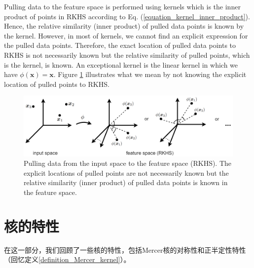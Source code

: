 \documentclass[lang=cn,10pt]{gorgeousnbook}
\numberwithin{equation}{section}%
\numberwithin{figure}{section}%
\begin{document}
Pulling data to the feature space is performed using kernels which is the inner product of points in RKHS according to Eq. (\ref{equation_kernel_inner_product}). Hence, the relative similarity (inner product) of pulled data points is known by the kernel. However, in most of kernels, we cannot find an explicit expression for the pulled data points. 
Therefore, the exact location of pulled data points to RKHS is not necessarily known but the relative similarity of pulled points, which is the kernel, is known. 
An exceptional kernel is the linear kernel in which we have $\phi(\boldsymbol{x}) = \boldsymbol{x}$. 
Figure \ref{figure_pulling} illustrates what we mean by not knowing the explicit location of pulled points to RKHS. 


\begin{figure}[!t]
\centering
\includegraphics[width=6in]{./images/pulling}
\caption{Pulling data from the input space to the feature space (RKHS). The explicit locations of pulled points are not necessarily known but the relative similarity (inner product) of pulled data points is known in the feature space.}
\label{figure_pulling}
\end{figure}

\section{核的特性}\label{section_kernel_characteristics}
在这一部分，我们回顾了一些核的特性，包括Mercer核的对称性和正半定性特性（回忆定义\ref{definition_Mercer_kernel}）。
\end{document}
